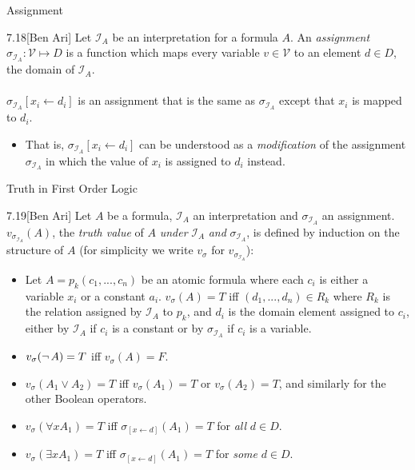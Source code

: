 \documentclass[style=sailor,size=12pt]{powerdot}
\begin{document}
\begin{wideslide}[bm=,toc=]{Assignment}
\begin{defn}{7.18}[Ben Ari]
Let $\mathcal{I}_A$ be an interpretation for a formula $A$. An
\emph{assignment} $\sigma_{\mathcal{I}_A}: \mathcal{V} \mapsto D$
is a function which maps every variable $v \in \mathcal{V}$ to an
element $d \in D$, the domain of $\mathcal{I}_A$.\\~\\
$\sigma_{\mathcal{I}_A}[x_i \leftarrow d_i]$ is an assignment that is
the same as $\sigma_{\mathcal{I}_A}$ except that $x_i$ is mapped to
$d_i$.
\end{defn}
\begin{itemize}
\item That is, $\sigma_{\mathcal{I}_A}[x_i \leftarrow d_i]$ can be
understood as a \emph{modification} of the assignment 
$\sigma_{\mathcal{I}_A}$ in which the value of $x_i$ is assigned
to $d_i$ instead.
\end{itemize}
\end{wideslide}


\begin{wideslide}[bm=,toc=]{Truth in First Order Logic}
\begin{defn}{7.19}[Ben Ari]
Let $A$ be a formula, $\mathcal{I}_A$ an interpretation and
$\sigma_{\mathcal{I}_A}$ an assignment. $v_{\sigma_{\mathcal{I}_A}}(A)$,
the \emph{truth value} of $A$ \emph{under} $\mathcal{I}_A$ \emph{and}
$\sigma_{\mathcal{I}_A}$, is defined by induction on the structure of
$A$ (for simplicity we write $v_{\sigma}$ for $v_{\sigma_{\mathcal{I}_A}}$):
\end{defn}
\vspace{-2ex}
\begin{itemize}
\item Let $A = p_k(c_1,...,c_n)$ be an atomic formula where each $c_i$ is
either a variable $x_i$ or a constant $a_i$. $v_{\sigma}(A) = T$ iff $(d_1,...,d_n)
\in R_k$ where $R_k$ is the relation assigned by $\mathcal{I}_A$ to $p_k$, and
$d_i$ is the domain element assigned to $c_i$, either by $\mathcal{I}_A$ if
$c_i$ is a constant or by $\sigma_{\mathcal{I}_A}$ if $c_i$ is a variable.
\item $v_{\sigma}(\mathop{\neg} A) = T$ iff $v_{\sigma}(A) = F$.
\item $v_{\sigma}(A_1 \lor A_2) = T$ iff $v_{\sigma}(A_1) = T$ or
$v_{\sigma}(A_2) = T$, and similarly for the other Boolean operators.
\item $v_{\sigma}(\forall x A_1) = T$ iff $\sigma_{[x \leftarrow d]}(A_1) = T$
for \emph{all} $d \in D$.
\item $v_{\sigma}(\exists x A_1) = T$ iff $\sigma_{[x \leftarrow d]}(A_1) = T$
for \emph{some} $d \in D$.
\end{itemize}
\end{wideslide}
\end{document}
